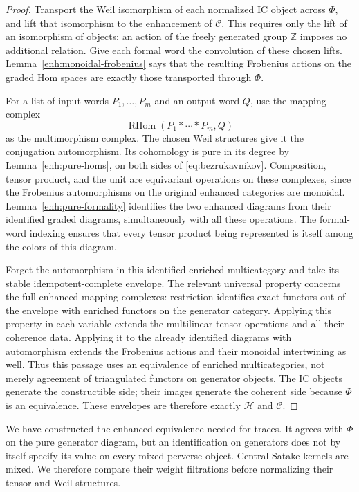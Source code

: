 \documentclass[11pt]{article}
\numberwithin{equation}{section}
\theoremstyle{definition}
\theoremstyle{remark}
\newcommand{\Z}{\mathbb Z}
\newcommand{\RHom}{\operatorname{RHom}}
\begin{document}
\begin{proof}
Transport the Weil isomorphism of each normalized IC object across
$\Phi$, and lift that isomorphism to the enhancement of
$\mathscr C$.  This requires only the lift of an isomorphism of
objects: an action of the freely generated group $\Z$ imposes no
additional relation.  Give each formal word the convolution of
these chosen lifts.  Lemma~\ref{enh:monoidal-frobenius} says that
the resulting Frobenius actions on the graded Hom spaces are
exactly those transported through $\Phi$.

For a list of input words $P_1,\ldots,P_m$ and an output word $Q$,
use the mapping complex
\[
 \RHom(P_1*\cdots*P_m,Q)
\]
as the multimorphism complex.  The chosen Weil structures give it
the conjugation automorphism.  Its cohomology is pure in its degree
by Lemma~\ref{enh:pure-homs}, on both sides of
\eqref{eq:bezrukavnikov}.  Composition, tensor product, and the
unit are equivariant operations on these complexes, since the
Frobenius automorphisms on the original enhanced categories are
monoidal.  Lemma~\ref{enh:pure-formality} identifies the two
enhanced diagrams from their identified graded diagrams,
simultaneously with all these operations.  The formal-word
indexing ensures that every tensor product being represented is
itself among the colors of this diagram.

Forget the automorphism in this identified enriched multicategory
and take its stable idempotent-complete envelope.  The relevant
universal property concerns the full enhanced mapping complexes:
restriction identifies exact functors out of the envelope with
enriched functors on the generator category.  Applying this property
in each variable extends the multilinear tensor operations and all
their coherence data.  Applying it to the already identified
diagrams with automorphism extends the Frobenius actions and their
monoidal intertwining as well.  Thus this passage uses an equivalence
of enriched multicategories, not merely agreement of triangulated
functors on generator objects.  The IC objects generate the constructible side;
their images generate the coherent side because $\Phi$ is an
equivalence.  These envelopes are therefore exactly
$\mathscr H$ and $\mathscr C$.
\end{proof}

We have constructed the enhanced equivalence needed for traces.
It agrees with $\Phi$ on the pure generator diagram, but an
identification on generators does not by itself specify its value
on every mixed perverse object.  Central Satake kernels are mixed.
We therefore compare their weight filtrations before normalizing
their tensor and Weil structures.
\end{document}
